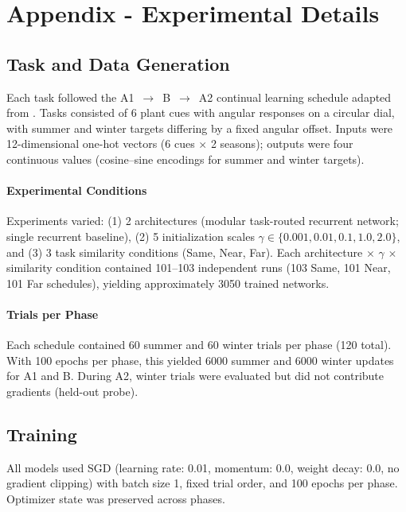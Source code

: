 \section{Appendix - Experimental Details}\label{sec:appendix:experimental-details}

\subsection{Task and Data Generation}

Each task followed the A1~$\rightarrow$~B~$\rightarrow$~A2 continual learning schedule adapted from \citet{holton2025humans}. Tasks consisted of 6 plant cues with angular responses on a circular dial, with summer and winter targets differing by a fixed angular offset. Inputs were 12-dimensional one-hot vectors (6 cues $\times$ 2 seasons); outputs were four continuous values (cosine--sine encodings for summer and winter targets).

\paragraph{Experimental Conditions} Experiments varied: (1) 2 architectures (modular task-routed recurrent network; single recurrent baseline), (2) 5 initialization scales $\gamma \in \{0.001, 0.01, 0.1, 1.0, 2.0\}$, and (3) 3 task similarity conditions (Same, Near, Far). Each architecture $\times$ $\gamma$ $\times$ similarity condition contained 101--103 independent runs (103 Same, 101 Near, 101 Far schedules), yielding approximately 3050 trained networks.

\paragraph{Trials per Phase} Each schedule contained 60 summer and 60 winter trials per phase (120 total). With 100 epochs per phase, this yielded 6000 summer and 6000 winter updates for A1 and B. During A2, winter trials were evaluated but did not contribute gradients (held-out probe).

\subsection{Training}

All models used SGD (learning rate: 0.01, momentum: 0.0, weight decay: 0.0, no gradient clipping) with batch size 1, fixed trial order, and 100 epochs per phase. Optimizer state was preserved across phases.

